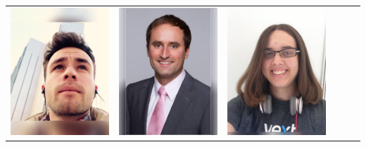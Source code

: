 \documentclass[landscape,a0paper,fontscale=0.292]{baposter}
\begin{document}
\begin{poster}
{\begin{center}
\begin{tabularx}{\linewidth}{X X X X X X}
{\centering \includegraphics[width=0.6\linewidth]{eharbitz.jpg}}&
{\centering \includegraphics[width=0.6\linewidth]{rkk.jpg}}&
{\centering \includegraphics[width=0.6\linewidth]{lapentab.jpg}}&

\end{tabularx}
\end{center}}
\end{poster}
\end{document}
